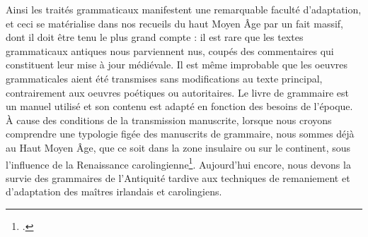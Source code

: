 \documentclass[a4paper, twoside, 12pt]{book}
\begin{document}
Ainsi les traités grammaticaux manifestent une remarquable faculté d'adaptation, et ceci se matérialise dans nos recueils du haut Moyen Âge par un fait massif, dont il doit être tenu le plus grand compte : il est rare que les textes grammaticaux antiques nous parviennent nus, coupés des commentaires qui constituent leur mise à jour médiévale. Il est même improbable que les oeuvres grammaticales aient été transmises sans modifications au texte principal, contrairement aux oeuvres poétiques ou autoritaires. Le livre de grammaire est un manuel utilisé et son contenu est adapté en fonction des besoins de l'époque. À cause des conditions de la transmission manuscrite, lorsque nous croyons comprendre une typologie figée des manuscrits de grammaire, nous sommes déjà au Haut Moyen Âge, que ce soit dans la zone insulaire ou sur le continent, sous l'influence de la Renaissance carolingienne\footnote{ \cite{holtz1995glosse}.}. Aujourd'hui encore, nous devons la survie des grammaires de l'Antiquité tardive aux techniques de remaniement et d'adaptation des maîtres irlandais et carolingiens.\\
\end{document}
